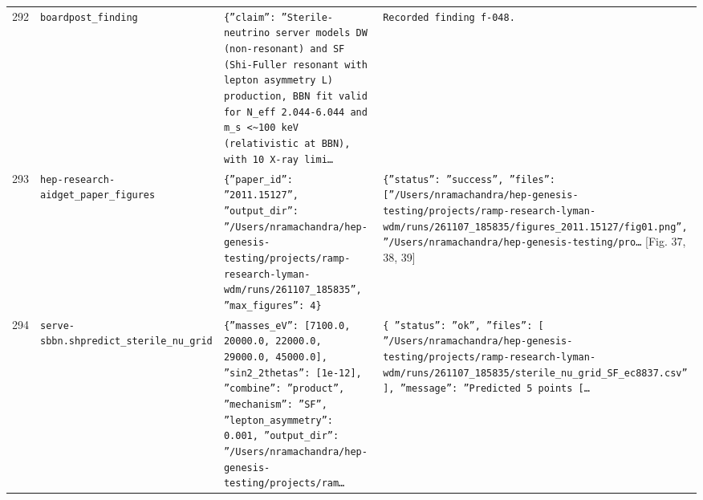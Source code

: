 \documentclass[11pt,a4paper]{article}
\begin{document}
\begin{longtable}{@{}p{}p{}p{}p{}@{}}
292 & \texttt{board}\newline\texttt{post\_\allowbreak{}finding} & \texttt{\{''claim'':\allowbreak{} ''Sterile-neutrino server models DW (non-resonant)\allowbreak{} and SF (Shi-Fuller resonant with lepton asymmetry L)\allowbreak{} production,\allowbreak{} BBN fit valid for N\_\allowbreak{}eff 2.044-6.044 and m\_\allowbreak{}s \textless{}\allowbreak{}\textasciitilde{}\allowbreak{}100 keV (relativistic at BBN)\allowbreak{},\allowbreak{} with 10 X-ray limi\ldots{}\allowbreak{}} & \texttt{Recorded finding f-048.} \\
293 & \texttt{hep-research-aid}\newline\texttt{get\_\allowbreak{}paper\_\allowbreak{}figures} & \texttt{\{''paper\_\allowbreak{}id'':\allowbreak{} ''2011.15127'',\allowbreak{} ''output\_\allowbreak{}dir'':\allowbreak{} ''/\allowbreak{}Users/\allowbreak{}nramachandra/\allowbreak{}hep-genesis-testing/\allowbreak{}projects/\allowbreak{}ramp-research-lyman-wdm/\allowbreak{}runs/\allowbreak{}261107\_\allowbreak{}185835'',\allowbreak{} ''max\_\allowbreak{}figures'':\allowbreak{} 4\}\allowbreak{}} & \texttt{\{''status'':\allowbreak{} ''success'',\allowbreak{} ''files'':\allowbreak{} [''/\allowbreak{}Users/\allowbreak{}nramachandra/\allowbreak{}hep-genesis-testing/\allowbreak{}projects/\allowbreak{}ramp-research-lyman-wdm/\allowbreak{}runs/\allowbreak{}261107\_\allowbreak{}185835/\allowbreak{}figures\_\allowbreak{}2011.15127/\allowbreak{}fig01.png'',\allowbreak{} ''/\allowbreak{}Users/\allowbreak{}nramachandra/\allowbreak{}hep-genesis-testing/\allowbreak{}pro\ldots{}\allowbreak{}} [Fig. 37, 38, 39] \\
294 & \texttt{serve-sbbn.sh}\newline\texttt{predict\_\allowbreak{}sterile\_\allowbreak{}nu\_\allowbreak{}grid} & \texttt{\{''masses\_\allowbreak{}eV'':\allowbreak{} [7100.0,\allowbreak{} 20000.0,\allowbreak{} 22000.0,\allowbreak{} 29000.0,\allowbreak{} 45000.0]\allowbreak{},\allowbreak{} ''sin2\_\allowbreak{}2thetas'':\allowbreak{} [1e-12]\allowbreak{},\allowbreak{} ''combine'':\allowbreak{} ''product'',\allowbreak{} ''mechanism'':\allowbreak{} ''SF'',\allowbreak{} ''lepton\_\allowbreak{}asymmetry'':\allowbreak{} 0.001,\allowbreak{} ''output\_\allowbreak{}dir'':\allowbreak{} ''/\allowbreak{}Users/\allowbreak{}nramachandra/\allowbreak{}hep-genesis-testing/\allowbreak{}projects/\allowbreak{}ram\ldots{}\allowbreak{}} & \texttt{\{   ''status'':\allowbreak{} ''ok'',\allowbreak{}   ''files'':\allowbreak{} [     ''/\allowbreak{}Users/\allowbreak{}nramachandra/\allowbreak{}hep-genesis-testing/\allowbreak{}projects/\allowbreak{}ramp-research-lyman-wdm/\allowbreak{}runs/\allowbreak{}261107\_\allowbreak{}185835/\allowbreak{}sterile\_\allowbreak{}nu\_\allowbreak{}grid\_\allowbreak{}SF\_\allowbreak{}ec8837.csv''   ]\allowbreak{},\allowbreak{}   ''message'':\allowbreak{} ''Predicted 5 points [\ldots{}\allowbreak{}} \\

\end{longtable}
\end{document}

